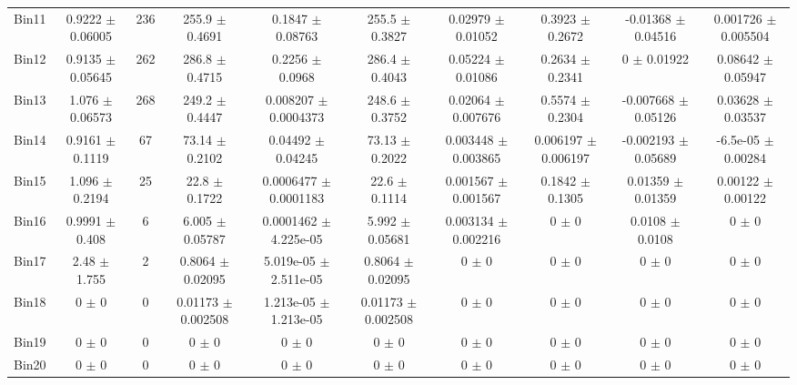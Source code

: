\begin{tabular}{@{\extracolsep{4pt}}lccccccccc@{}}
     Bin11 & 0.9222 $\pm$ 0.06005 & 236 & 255.9 $\pm$ 0.4691 & 0.1847 $\pm$ 0.08763 & 255.5 $\pm$ 0.3827 & 0.02979 $\pm$ 0.01052 & 0.3923 $\pm$ 0.2672 & -0.01368 $\pm$ 0.04516 & 0.001726 $\pm$ 0.005504 \\ 
     Bin12 & 0.9135 $\pm$ 0.05645 & 262 & 286.8 $\pm$ 0.4715 & 0.2256 $\pm$ 0.0968 & 286.4 $\pm$ 0.4043 & 0.05224 $\pm$ 0.01086 & 0.2634 $\pm$ 0.2341 & 0 $\pm$ 0.01922 & 0.08642 $\pm$ 0.05947 \\ 
     Bin13 & 1.076 $\pm$ 0.06573 & 268 & 249.2 $\pm$ 0.4447 & 0.008207 $\pm$ 0.0004373 & 248.6 $\pm$ 0.3752 & 0.02064 $\pm$ 0.007676 & 0.5574 $\pm$ 0.2304 & -0.007668 $\pm$ 0.05126 & 0.03628 $\pm$ 0.03537 \\ 
     Bin14 & 0.9161 $\pm$ 0.1119 & 67 & 73.14 $\pm$ 0.2102 & 0.04492 $\pm$ 0.04245 & 73.13 $\pm$ 0.2022 & 0.003448 $\pm$ 0.003865 & 0.006197 $\pm$ 0.006197 & -0.002193 $\pm$ 0.05689 & -6.5e-05 $\pm$ 0.00284 \\ 
     Bin15 & 1.096 $\pm$ 0.2194 & 25 & 22.8 $\pm$ 0.1722 & 0.0006477 $\pm$ 0.0001183 & 22.6 $\pm$ 0.1114 & 0.001567 $\pm$ 0.001567 & 0.1842 $\pm$ 0.1305 & 0.01359 $\pm$ 0.01359 & 0.00122 $\pm$ 0.00122 \\ 
     Bin16 & 0.9991 $\pm$ 0.408 & 6 & 6.005 $\pm$ 0.05787 & 0.0001462 $\pm$ 4.225e-05 & 5.992 $\pm$ 0.05681 & 0.003134 $\pm$ 0.002216 & 0 $\pm$ 0 & 0.0108 $\pm$ 0.0108 & 0 $\pm$ 0 \\ 
     Bin17 & 2.48 $\pm$ 1.755 & 2 & 0.8064 $\pm$ 0.02095 & 5.019e-05 $\pm$ 2.511e-05 & 0.8064 $\pm$ 0.02095 & 0 $\pm$ 0 & 0 $\pm$ 0 & 0 $\pm$ 0 & 0 $\pm$ 0 \\ 
     Bin18 & 0 $\pm$ 0 & 0 & 0.01173 $\pm$ 0.002508 & 1.213e-05 $\pm$ 1.213e-05 & 0.01173 $\pm$ 0.002508 & 0 $\pm$ 0 & 0 $\pm$ 0 & 0 $\pm$ 0 & 0 $\pm$ 0 \\ 
     Bin19 & 0 $\pm$ 0 & 0 & 0 $\pm$ 0 & 0 $\pm$ 0 & 0 $\pm$ 0 & 0 $\pm$ 0 & 0 $\pm$ 0 & 0 $\pm$ 0 & 0 $\pm$ 0 \\ 
     Bin20 & 0 $\pm$ 0 & 0 & 0 $\pm$ 0 & 0 $\pm$ 0 & 0 $\pm$ 0 & 0 $\pm$ 0 & 0 $\pm$ 0 & 0 $\pm$ 0 & 0 $\pm$ 0 \\ 
\hline\hline
  \end{tabular}
